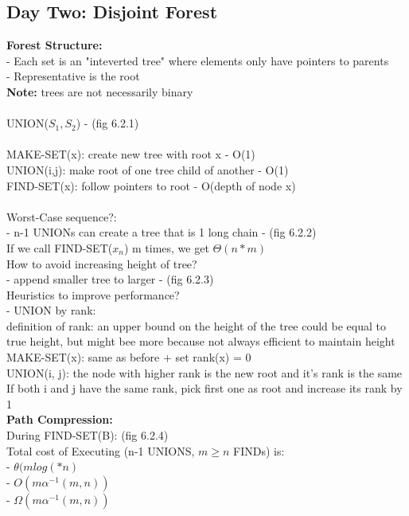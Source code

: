 \documentclass{article}
\begin{document}
	\subsection{Day Two: Disjoint Forest}
	\textbf{Forest Structure: \\}
	- Each set is an "inteverted tree" where elements only have pointers to parents\\
	- Representative is the root\\
	\textbf{Note:} trees are not necessarily binary\\\\
	UNION($S_1,S_2$) - (fig 6.2.1)\\\\
	MAKE-SET(x): create new tree with root x - O(1)\\
	UNION(i,j): make root of one tree child of another - O(1)\\
	FIND-SET(x): follow pointers to root - O(depth of node x)\\\\
	Worst-Case sequence?:\\
	- n-1 UNIONs can create a tree that is 1 long chain - (fig 6.2.2)\\
	If we call FIND-SET($x_n$) m times, we get $\Theta(n*m)$\\
	How to avoid increasing height of tree?\\ - append smaller tree to larger - (fig 6.2.3)\\
	Heuristics to improve performance?\\
	- UNION by rank:\\
	definition of rank: an upper bound on the height of the tree could be equal to true height, but might bee more because not always efficient to maintain height\\
	MAKE-SET(x): same as before + set rank(x) = 0\\
	UNION(i, j): the node with higher rank is the new root and it's rank is the same\\
	If both i and j have the same rank, pick first one as root and increase its rank by 1\\
	\textbf{Path Compression:\\}
	During FIND-SET(B): (fig 6.2.4)\\
	Total cost of Executing (n-1 UNIONS, $m\ge n$ FINDs) is:\\
	- $\theta(mlog(*n)$\\
	- $O(m\alpha^{-1}(m,n))$\\
	- $\Omega(m\alpha^{-1}(m,n))$\\\\
\end{document}
